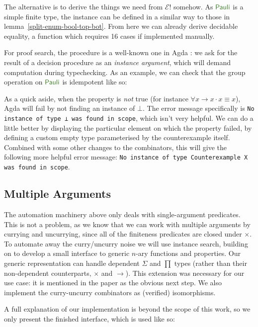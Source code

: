 The alternative is to derive the things we need from \(\mathcal{E}!\) somehow.
As \(\AgdaDatatype{Pauli}\) is a simple finite type, the instance can be defined
in a similar way to those in lemma~\ref{split-enum-bool-top-bot}.
From here we can already derive decidable equality, a function which requires 16
cases if implemented manually.

For proof search, the procedure is a well-known one in Agda
\cite{devrieseBrightSideType2011}: we ask for the result of a decision procedure
as an \emph{instance argument}, which will demand computation during
typechecking.
As an example, we can check that the group operation on \(\AgdaDatatype{Pauli}\)
is idempotent like so:

As a quick aside, when the property is \emph{not} true (for instance \(\forall x
\rightarrow x \cdot x \equiv x\)), Agda will fail by not finding an instance of
\(\bot\).
The error message specifically is
\verb+No instance of type ⊥ was found in scope+, which isn't very helpful.
We can do a little better by displaying the particular element on which the
property failed, by defining a custom empty type parameterised by the
counterexample itself.
Combined with some other changes to the combinators, this will give the
following more helpful error message:
\verb+No instance of type Counterexample X was found in scope+.
\subsection{Multiple Arguments}
The automation machinery above only deals with single-argument predicates.
This is not a problem, as we know that we can work with multiple arguments by
currying and uncurrying, since all of the finiteness predicates are closed under
\(\times\).
To automate away the curry/uncurry noise we will use instance search, building
on \cite{allaisGenericLevelPolymorphic2019} to develop a small interface to
generic \(n\)-ary functions and properties.
Our generic representation can handle dependent \(\Sigma\) and \(\prod\)
types (rather than their non-dependent counterparts, \(\times\) and
\(\rightarrow\)).
This extension was necessary for our use case: it is mentioned in the paper
as the obvious next step. 
We also implement the curry-uncurry combinators as (verified) isomorphisms.

A full explanation of our implementation is beyond the scope of this work, so we
only present the finished interface, which is used like so:



